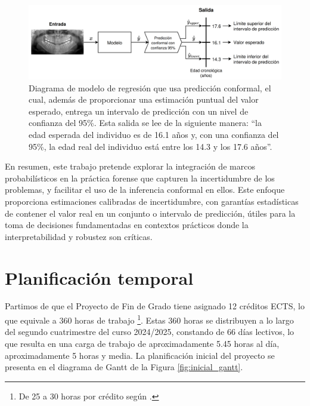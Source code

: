 \begin{figure}[htbp]
    \centering
    \includegraphics[width=\textwidth]{capitulos/cap_01/imagenes/example_intervalic_estimation.png}
    \caption[
        Diagrama de modelo de regresión que usa predicción conformal, el cual, además de proporcionar una estimación puntual del valor esperado, entrega un intervalo de predicción con un nivel de confianza del 95\%.
    ]{ 
        Diagrama de modelo de regresión que usa predicción conformal, el cual, además de proporcionar una estimación puntual del valor esperado, entrega un intervalo de predicción con un nivel de confianza del 95\%.
        Esta salida se lee de la siguiente manera: ``la edad esperada del individuo es de 16.1 años y, con una confianza del 95\%, la edad real del individuo está entre los 14.3 y los 17.6 años''.
    } 
    \label{fig:example_intervalic_estimation}
\end{figure}


En resumen, este trabajo pretende explorar la integración de marcos probabilísticos en la práctica forense que capturen la incertidumbre de los problemas, y facilitar el uso de la inferencia conformal en ellos. Este enfoque proporciona estimaciones calibradas de incertidumbre, con garantías estadísticas de contener el valor real en un conjunto o intervalo de predicción, útiles para la toma de decisiones fundamentadas en contextos prácticos donde la interpretabilidad y robustez son críticas.


\section{Planificación temporal}

Partimos de que el Proyecto de Fin de Grado tiene asignado 12 créditos ECTS, lo que equivale a 360 horas de trabajo%
\footnote{
    De 25 a 30 horas por crédito según \cite{ComisionEuropea2015ECTS}.
}. Estas 360 horas se distribuyen a lo largo del segundo cuatrimestre del curso 2024/2025, constando de 66 días lectivos, lo que resulta en una carga de trabajo de aproximadamente 5.45 horas al día, aproximadamente 5 horas y media. La planificación inicial del proyecto se presenta en el diagrama de Gantt de la Figura \ref{fig:inicial_gantt}.


